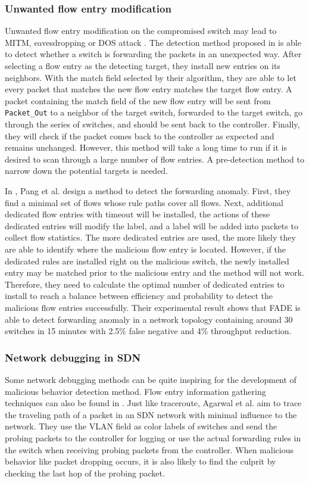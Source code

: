 \documentclass[conference]{IEEEtran}
\begin{document}
\subsubsection{Unwanted flow entry modification}
Unwanted flow entry modification on the compromised switch may lead to MITM, eavesdropping or DOS attack \cite{AAS14}. The detection method proposed in \cite{CKGL15} is able to detect whether a switch is forwarding the packets in an unexpected way. After selecting a flow entry as the detecting target, they install new entries on its neighbors. With the match field selected by their algorithm, they are able to let every packet that matches the new flow entry matches the target flow entry. A packet containing the match field of the new flow entry will be sent from \texttt{Packet\_Out} to a neighbor of the target switch, forwarded to the target switch, go through the series of switches, and should be sent back to the controller. Finally, they will check if the packet comes back to the controller as expected and remains unchanged. However, this method will take a long time to run if it is desired to scan through a large number of flow entries. A pre-detection method to narrow down the potential targets is needed.

In \cite{PJL16}, Pang et al. design a method to detect the forwarding anomaly. First, they find a minimal set of flows whose rule paths cover all flows. Next, additional dedicated flow entries with timeout will be installed, the actions of these dedicated entries will modify the label, and a label will be added into packets to collect flow statistics. The more dedicated entries are used, the more likely they are able to identify where the malicious flow entry is located. However, if the dedicated rules are installed right on the malicious switch, the newly installed entry may be matched prior to the malicious entry and the method will not work. Therefore, they need to calculate the optimal number of dedicated entries to install to reach a balance between efficiency and probability to detect the malicious flow entries successfully. Their experimental result shows that FADE is able to detect forwarding anomaly in a network topology containing around 30 switches in 15 minutes with 2.5\% false negative and 4\% throughput reduction.

\subsubsection{Network debugging in SDN}
Some network debugging methods can be quite inspiring for the development of malicious behavior detection method. Flow entry information gathering techniques can also be found in \cite{ARDC14}. Just like traceroute, Agarwal et al. aim to trace the traveling path of a packet in an SDN network with minimal influence to the network. They use the VLAN field as color labels of switches and send the probing packets to the controller for logging or use the actual forwarding rules in the switch when receiving probing packets from the controller. When malicious behavior like packet dropping occurs, it is also likely to find the culprit by checking the last hop of the probing packet.
\end{document}
